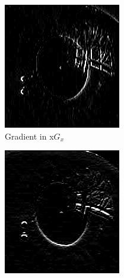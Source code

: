 \begin{figure}[ht]
\begin{subfigure}{.33\textwidth}
          \includegraphics[width=.9\linewidth]{plots/eye_dataset/sx.png}
          \caption{Gradient in x\textbf{$G_{x}$}}
          \label{fig:sx}
        \end{subfigure}%
        \begin{subfigure}{.33\textwidth}
          \centering
          \includegraphics[width=.9\linewidth]{plots/eye_dataset/sy.png}

\end{subfigure}
\end{figure}
